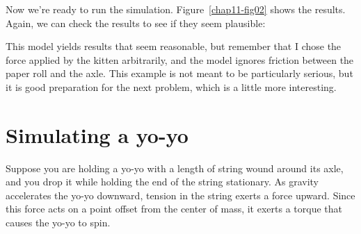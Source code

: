 \documentclass[12pt]{book}
\theoremstyle{exercise}
\newcommand{\py}{\verb}%}
\begin{document}
Now we're ready to run the simulation.  Figure~\ref{chap11-fig02} shows the results.  Again, we can check the results to see if they seem plausible:


This model yields results that seem reasonable, but remember that I chose the force applied by the kitten arbitrarily, and the model ignores friction between the paper roll and the axle.  This example is not meant to be particularly serious, but it is good preparation for the next problem, which is a little more interesting.


\section{Simulating a yo-yo}

Suppose you are holding a yo-yo with a length of string wound around its axle, and you drop it while holding the end of the string stationary.  As gravity accelerates the yo-yo downward, tension in the string exerts a force upward.  Since this force acts on a point offset from the center of mass, it exerts a torque that causes the yo-yo to spin.
\end{document}

